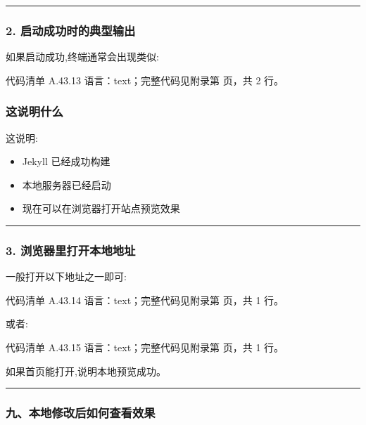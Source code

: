 \documentclass[lang=cn,scheme=chinese,color=blue,device=normal,toc=onecol,math=cm]{elegantbook}
\begin{document}
\medskip\hrule\medskip


\subsubsection{2. 启动成功时的典型输出}


如果启动成功,终端通常会出现类似:\par


\begin{codeindexbox}{代码清单 A.43.13}
语言：text；完整代码见附录第 \pageref{code:43:13} 页，共 2 行。
\end{codeindexbox}


\subsubsection{这说明什么}


这说明:\par


\begin{itemize}
\item Jekyll 已经成功构建
\item 本地服务器已经启动
\item 现在可以在浏览器打开站点预览效果
\end{itemize}


\medskip\hrule\medskip


\subsubsection{3. 浏览器里打开本地地址}


一般打开以下地址之一即可:\par


\begin{codeindexbox}{代码清单 A.43.14}
语言：text；完整代码见附录第 \pageref{code:43:14} 页，共 1 行。
\end{codeindexbox}


或者:\par


\begin{codeindexbox}{代码清单 A.43.15}
语言：text；完整代码见附录第 \pageref{code:43:15} 页，共 1 行。
\end{codeindexbox}


如果首页能打开,说明本地预览成功。\par


\medskip\hrule\medskip


\subsubsection{九、本地修改后如何查看效果}
\end{document}
